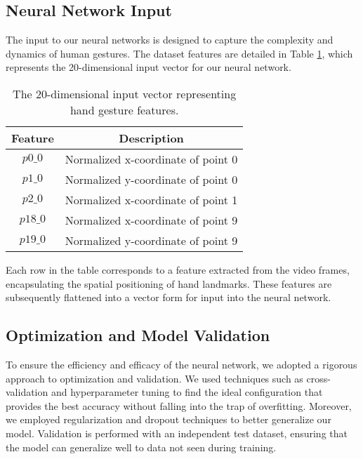 \documentclass{article}
\begin{document}
\subsection{Neural Network Input}

The input to our neural networks is designed to capture the complexity and dynamics of human gestures. The dataset features are detailed in Table \ref{tab:dataset_features}, which represents the 20-dimensional input vector for our neural network.

\begin{table}[h]
\centering
\begin{tabular}{|c|c|}
\hline
\textbf{Feature} & \textbf{Description} \\ \hline
\( p0\_0 \) & Normalized x-coordinate of point 0 \\ \hline
\( p1\_0 \) & Normalized y-coordinate of point 0 \\ \hline
\( p2\_0 \) & Normalized x-coordinate of point 1 \\ \hline
\( p18\_0 \) & Normalized x-coordinate of point 9 \\ \hline
\( p19\_0 \) & Normalized y-coordinate of point 9 \\ \hline
\end{tabular}
\caption{The 20-dimensional input vector representing hand gesture features.}
\label{tab:dataset_features}
\end{table}

Each row in the table corresponds to a feature extracted from the video frames, encapsulating the spatial positioning of hand landmarks. These features are subsequently flattened into a vector form for input into the neural network.

\subsection{Optimization and Model Validation}

To ensure the efficiency and efficacy of the neural network, we adopted a rigorous approach to optimization and validation. We used techniques such as cross-validation and hyperparameter tuning to find the ideal configuration that provides the best accuracy without falling into the trap of overfitting. Moreover, we employed regularization and dropout techniques to better generalize our model. Validation is performed with an independent test dataset, ensuring that the model can generalize well to data not seen during training.
\end{document}
